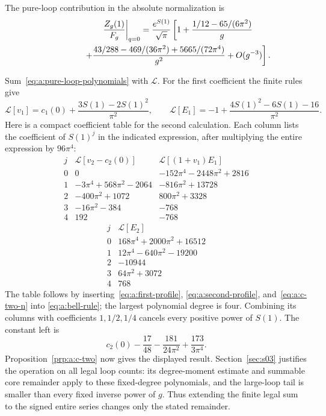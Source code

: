 \begin{prp}\label{prp:a:pure-loops}
The pure-loop contribution in the absolute normalization is
\begin{align}
 \left.\frac{Z_g(1)}{F_g}\right|_{q=0}
 =\frac{e^{S(1)}}{\sqrt\pi}\left[1
 +\frac{1/12-65/(6\pi^2)}g\right.\qquad\notag\\
 \left.\hspace{18mm}
 +\frac{43/288-469/(36\pi^2)+5665/(72\pi^4)}{g^2}
 +O(g^{-3})\right].
 \label{eq:a:q-zero}
\end{align}
\end{prp}
\begin{prf}
Sum~\eqref{eq:a:pure-loop-polynomials} with $\mathcal L$.
For the first coefficient the finite rules give
\[
 \mathcal L[v_1]=c_1(0)+\frac{3S(1)-2S(1)^2}{\pi^2},\qquad
 \mathcal L[E_1]=-1+\frac{4S(1)^2-6S(1)-16}{\pi^2}.
\]
Here is a compact coefficient table for the second calculation. Each
column lists the coefficient of $S(1)^j$ in the indicated expression,
after multiplying the entire expression by $96\pi^4$:
\[
\begin{array}{c|r|r}
 j&\mathcal L[v_2-c_2(0)]&\mathcal L[(1+v_1)E_1]\\\hline
0&0&-152\pi^4-2448\pi^2+2816\\
1&-3\pi^4+568\pi^2-2064&-816\pi^2+13728\\
2&-400\pi^2+1072&800\pi^2+3328\\
3&-16\pi^2-384&-768\\
4&192&-768
\end{array}
\]
\[
\begin{array}{c|r}
 j&\mathcal L[E_2]\\\hline
0&168\pi^4+2000\pi^2+16512\\
1&12\pi^4-640\pi^2-19200\\
2&-10944\\
3&64\pi^2+3072\\
4&768
\end{array}
\]
The table follows by inserting~\eqref{eq:a:first-profile},
\eqref{eq:a:second-profile}, and~\eqref{eq:a:c-two-n} into
\eqref{eq:a:bell-rule}; the largest polynomial degree is four.
Combining its columns with coefficients $1,1/2,1/4$ cancels every
positive power of $S(1)$. The constant left is
\[
 c_2(0)-\frac{17}{48}-\frac{181}{24\pi^2}
                                      +\frac{173}{3\pi^4}.
\]
Proposition~\ref{prp:a:c-two} now gives the displayed result.
Section~\ref{sec:s03} justifies the operation on all legal loop
counts: its degree-moment estimate and summable core remainder apply
to these fixed-degree polynomials, and the large-loop tail is smaller
than every fixed inverse power of $g$. Thus extending the finite legal
sum to the signed entire series changes only the stated remainder.
\end{prf}

